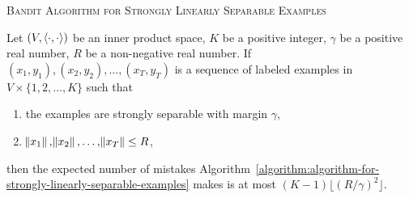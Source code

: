 \begin{algorithm}[h]
\caption{\textsc{Bandit Algorithm for Strongly Linearly Separable Examples}
\label{algorithm:algorithm-for-strongly-linearly-separable-examples}}
\begin{algorithmic}[1]
{
\ELSE
{}
\label{line:pos-update}
\ENDIF
\ELSE
{}
\label{line:neg-update}
\ELSE
{}
\ENDIF
\ENDIF
\ENDFOR
}
\end{algorithmic}
\end{algorithm}

\begin{theorem}
\label{theorem:strongly-separable-example-mistake-upper-bound}
Let $(V, \left\langle \cdot, \cdot \right\rangle)$ be an inner product space, $K$ be a positive
integer, $\gamma$ be a positive real number, $R$ be a non-negative real number. If
$(x_1, y_1), (x_2, y_2), \dots, (x_T, y_T)$ is a sequence of labeled examples in
$V \times \{1,2,\dots,K\}$ such that
\begin{enumerate}
  \item the examples are strongly separable with margin $\gamma$,
  \item $\norm{x_1}, \norm{x_2}, \dots, \norm{x_T} \le R$,
\end{enumerate}
then the
expected number of mistakes
Algorithm~\ref{algorithm:algorithm-for-strongly-linearly-separable-examples}
makes is at most $(K-1) \lfloor (R/\gamma)^2 \rfloor$.
\end{theorem}

